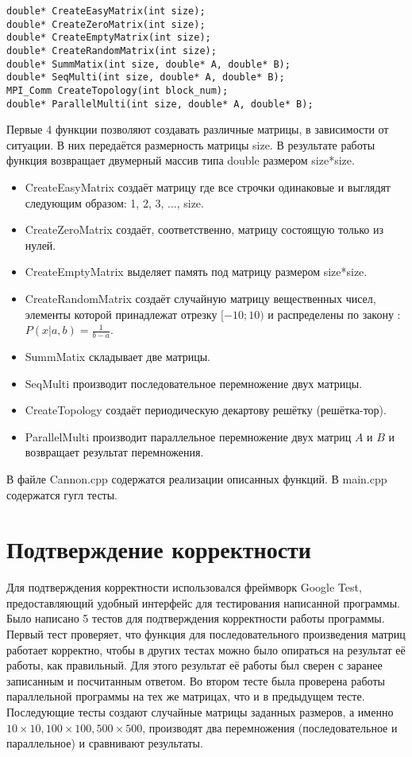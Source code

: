 \documentclass[12pt, letterpaper]{article}
\begin{document}
\begin{lstlisting}
double* CreateEasyMatrix(int size);
double* CreateZeroMatrix(int size);
double* CreateEmptyMatrix(int size);
double* CreateRandomMatrix(int size);
double* SummMatix(int size, double* A, double* B);
double* SeqMulti(int size, double* A, double* B);
MPI_Comm CreateTopology(int block_num);
double* ParallelMulti(int size, double* A, double* B);
\end{lstlisting}
Первые 4 функции позволяют создавать различные матрицы, в зависимости от ситуации. В них передаётся размерность матрицы size. В результате работы функция возвращает двумерный массив типа double размером size*size.
\begin{itemize}
\item CreateEasyMatrix создаёт матрицу где все строчки одинаковые и выглядят следующим образом: 1, 2, 3, ..., size. 
\item CreateZeroMatrix создаёт, соответственно, матрицу состоящую только из нулей. 
\item CreateEmptyMatrix выделяет память под матрицу размером size*size. 
\item CreateRandomMatrix создаёт случайную матрицу вещественных чисел, элементы которой принадлежат отрезку $[-10;10)$ и распределены по закону :$ P(x|a,b) = \frac{1}{b-a}$. 
\item SummMatix складывает две матрицы. 
\item SeqMulti производит последовательное перемножение двух матрицы. 
\item CreateTopology создаёт периодическую декартову решётку (решётка-тор). 
\item ParallelMulti производит параллельное перемножение двух матриц $A$ и $B$ и возвращает результат перемножения.
\end{itemize}
В файле Cannon.cpp содержатся реализации описанных функций.
В main.cpp содержатся гугл тесты.
\newpage

\section*{Подтверждение корректности}
\par Для подтверждения корректности использовался фреймворк Google Test, предоставляющий удобный интерфейс для тестирования написанной программы. Было написано 5 тестов для подтверждения корректности работы программы. Первый тест проверяет, что функция для последовательного произведения матриц работает корректно, чтобы в других тестах можно было опираться на результат её работы, как правильный. Для этого результат её работы был сверен с заранее записанным и посчитанным ответом. Во втором тесте была проверена работы параллельной программы на тех же матрицах, что и в предыдущем тесте. Последующие тесты создают случайные матрицы заданных размеров, а именно $10\times10, 100\times100, 500\times500$, производят два перемножения (последовательное и параллельное) и сравнивают результаты.  
\end{document}
